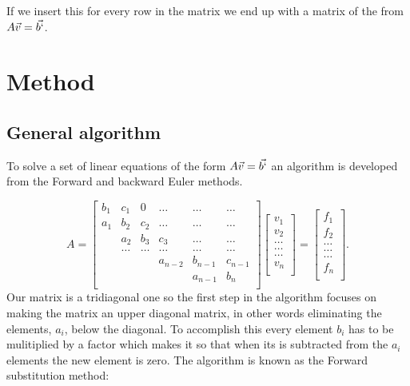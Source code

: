 \documentclass[english,a4paper, 11pt]{article}
\begin{document}
 If we insert this for every row in the matrix we end up with a matrix of the from $A\vec{v} = \vec{b`}$.
 
\section{Method}
\subsection{General algorithm}
To solve a set of linear equations of the form $A\vec{v} = \vec{b`}$ an algorithm is developed from the Forward and backward Euler methods. 

$$
    A = \begin{bmatrix}
                           b_1& c_1 & 0 &\dots   & \dots &\dots \\
                           a_1 & b_2 & c_2 &\dots &\dots &\dots \\
                           & a_2 & b_3 & c_3 & \dots & \dots \\
                           & \dots   & \dots &\dots   &\dots & \dots \\
                           &   &  &a_{n-2}  &b_{n-1}& c_{n-1} \\
                           &    &  &   &a_{n-1} & b_n \\
                      \end{bmatrix}\begin{bmatrix}
                           v_1\\
                           v_2\\
                           \dots \\
                          \dots  \\
                          \dots \\
                           v_n\\
                      \end{bmatrix}
  =\begin{bmatrix}
                           f_1\\
                           f_2\\
                           \dots \\
                           \dots \\
                          \dots \\
                           f_n\\
                      \end{bmatrix}.
$$
Our matrix is a tridiagonal one so the first step in the algorithm focuses on making the matrix an upper diagonal matrix, in other words eliminating the elements, $a_i$, below the diagonal. To accomplish this every element $b_i$ has to be mulitiplied by a factor which makes it so that when its is subtracted from the $a_i$ elements the new element is zero. The algorithm is known as the Forward substitution method:
\end{document}
